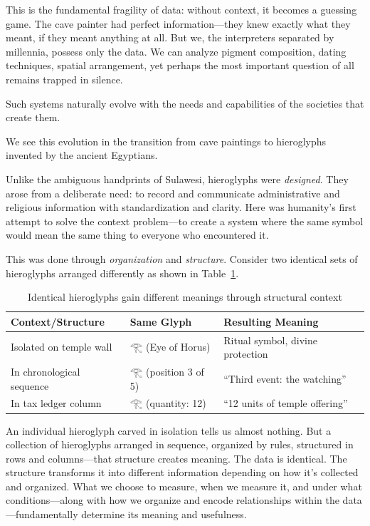 This is the fundamental fragility of data: without context, it becomes a guessing game. 
The cave painter had perfect information—they knew exactly what they meant, if they meant anything at all. 
But we, the interpreters separated by millennia, possess only the data. 
We can analyze pigment composition, dating techniques, spatial arrangement, yet perhaps the most important question of all remains trapped in silence.

Such systems naturally evolve with the needs and capabilities of the societies that create them. 

We see this evolution in the transition from cave paintings to hieroglyphs invented by the ancient Egyptians.

Unlike the ambiguous handprints of Sulawesi, hieroglyphs were \textit{designed}. 
They arose from a deliberate need: to record and communicate administrative and religious information with standardization and clarity. 
Here was humanity's first attempt to solve the context problem—to create a system where the same symbol would mean the same thing to everyone who encountered it. 

This was done through \textit{organization} and \textit{structure}. Consider two identical sets of hieroglyphs arranged differently as shown in Table~\ref{tab:hieroglyph-context}.

\begin{table}[ht]
\centering
\caption{Identical hieroglyphs gain different meanings through structural context}
\label{tab:hieroglyph-context}
\begin{tabular}{lll}
\toprule
\textbf{Context/Structure} & \textbf{Same Glyph} & \textbf{Resulting Meaning} \\
\midrule
Isolated on temple wall & {\egyptfont 𓂀} (Eye of Horus) & Ritual symbol, divine protection \\
In chronological sequence & {\egyptfont 𓂀} (position 3 of 5) & ``Third event: the watching'' \\
In tax ledger column & {\egyptfont 𓂀} (quantity: 12) & ``12 units of temple offering'' \\
\bottomrule
\end{tabular}
\end{table}

An individual hieroglyph carved in isolation tells us almost nothing. But a collection of hieroglyphs arranged in sequence, organized by rules, structured in rows and columns---that structure creates meaning. 
The data is identical. The structure transforms it into different information depending on how it's collected and organized. 
What we choose to measure, when we measure it, and under what conditions---along with how we organize and encode relationships within the data---fundamentally determine its meaning and usefulness.

